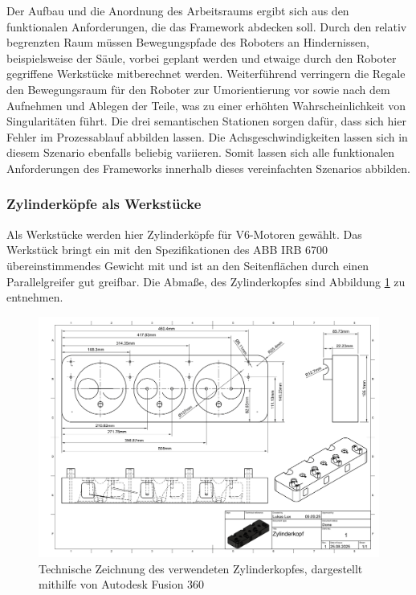 Der Aufbau und die Anordnung des Arbeitsraums ergibt sich aus den funktionalen
Anforderungen, die das Framework abdecken soll. Durch den relativ begrenzten
Raum müssen Bewegungspfade des Roboters an Hindernissen,
beispielsweise der Säule, vorbei
geplant werden und etwaige durch den Roboter gegriffene Werkstücke
mitberechnet werden. Weiterführend verringern die Regale den Bewegungsraum für
den Roboter zur Umorientierung vor sowie nach dem Aufnehmen und
Ablegen der Teile,
was zu einer erhöhten Wahrscheinlichkeit von Singularitäten führt. Die drei
semantischen Stationen sorgen dafür, dass sich hier Fehler im Prozessablauf
abbilden lassen. Die Achsgeschwindigkeiten lassen sich in diesem Szenario
ebenfalls beliebig variieren. Somit lassen sich alle funktionalen Anforderungen
des Frameworks innerhalb dieses vereinfachten Szenarios abbilden.

\subsubsection{Zylinderköpfe als Werkstücke}
Als Werkstücke werden hier Zylinderköpfe für V6-Motoren gewählt. Das Werkstück
bringt ein mit den Spezifikationen des ABB IRB 6700 übereinstimmendes Gewicht
mit und ist an den Seitenflächen durch einen Parallelgreifer gut greifbar. Die
Abmaße, des Zylinderkopfes sind Abbildung \ref{figure:cylinderhead}
zu entnehmen.

\begin{figure}[H]
  \centering
  \includegraphics[width=\linewidth]{Figures/CyclinderHead-1.png}
  \caption{Technische Zeichnung des verwendeten Zylinderkopfes, dargestellt
  mithilfe von Autodesk Fusion 360}
  \label{figure:cylinderhead}
\end{figure}

